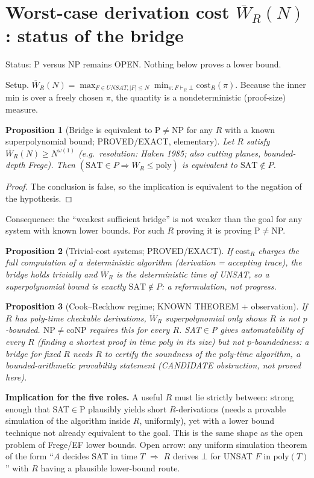 \documentclass{article}
\newtheorem{prop}{Proposition}
\begin{document}
\section*{Worst-case derivation cost $\overline W_R(N)$: status of the bridge}
Status: P versus NP remains OPEN. Nothing below proves a lower bound.

Setup. $\overline W_R(N)=\max_{F\in UNSAT,|F|\le N}\min_{\pi:F\vdash_R\bot}\mathrm{cost}_R(\pi)$.
Because the inner min is over a freely chosen $\pi$, the quantity is a nondeterministic (proof-size) measure.

\begin{prop}[Bridge is equivalent to P$\neq$NP for any $R$ with a known superpolynomial bound; PROVED/EXACT, elementary]
Let $R$ satisfy $\overline W_R(N)\ge N^{\omega(1)}$ (e.g.\ resolution: Haken 1985; also cutting planes, bounded-depth Frege). Then
$(\mathrm{SAT}\in P\Rightarrow \overline W_R\le \mathrm{poly})$ is equivalent to $\mathrm{SAT}\notin P$.
\end{prop}
\begin{proof} The conclusion is false, so the implication is equivalent to the negation of the hypothesis. \end{proof}
Consequence: the ``weakest sufficient bridge'' is not weaker than the goal for any system with known lower bounds. For such $R$ proving it is proving P$\ne$NP.

\begin{prop}[Trivial-cost systems; PROVED/EXACT]
If $\mathrm{cost}_R$ charges the full computation of a deterministic algorithm (derivation = accepting trace), the bridge holds trivially and $\overline W_R$ is the deterministic time of UNSAT, so a superpolynomial bound is exactly $\mathrm{SAT}\notin P$: a reformulation, not progress.
\end{prop}

\begin{prop}[Cook--Reckhow regime; KNOWN THEOREM + observation]
If $R$ has poly-time checkable derivations, $\overline W_R$ superpolynomial only shows $R$ is not $p$-bounded. $\mathrm{NP}\ne\mathrm{coNP}$ requires this for every $R$. SAT$\in$P gives automatability of every $R$ (finding a shortest proof in time poly in its size) but not $p$-boundedness: a bridge for fixed $R$ needs $R$ to certify the soundness of the poly-time algorithm, a bounded-arithmetic provability statement (CANDIDATE obstruction, not proved here).
\end{prop}

\textbf{Implication for the five roles.} A useful $R$ must lie strictly between: strong enough that SAT$\in$P plausibly yields short $R$-derivations (needs a provable simulation of the algorithm inside $R$, uniformly), yet with a lower bound technique not already equivalent to the goal. This is the same shape as the open problem of Frege/EF lower bounds. Open arrow: any uniform simulation theorem of the form ``$A$ decides SAT in time $T$ $\Rightarrow$ $R$ derives $\bot$ for UNSAT $F$ in $\mathrm{poly}(T)$'' with $R$ having a plausible lower-bound route.
\end{document}
